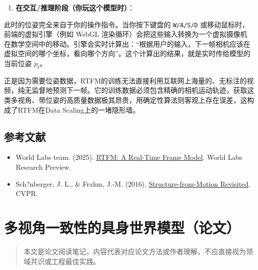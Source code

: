 \begin{enumerate}
\def\labelenumi{\arabic{enumi}.}
\setcounter{enumi}{1}
\tightlist
\item
  \textbf{在交互/推理阶段（你玩这个模型时）}：
\end{enumerate}

此时的位姿完全来自于你的操作指令。当你按下键盘的 \texttt{W/A/S/D} 或移动鼠标时，前端的虚拟引擎（例如 WebGL 渲染循环）会把这些输入转换为一个虚拟摄像机在数学空间中的移动。引擎会实时计算出：``根据用户的输入，下一帧相机应该在虚拟空间的哪个坐标，看向哪个方向''。这个计算出的结果，就是实时传给模型的当前位姿 \(p_t\)。

正是因为需要位姿数据，RTFM的训练无法直接利用互联网上海量的、无标注的视频，纯无监督地预测下一帧。它的训练数据必须包含精确的相机运动轨迹，获取这类多视角、带位姿的高质量数据极其昂贵，用确定性算法则客观上存在误差，这构成了RTFM在Data Scaling上的一堵隐形墙。

\hypertarget{ux53c2ux8003ux6587ux732e-183}{%
\subsection{参考文献}\label{ux53c2ux8003ux6587ux732e-183}}

\begin{itemize}
\tightlist
\item
  World Labs team. (2025). \href{https://www.worldlabs.ai/blog/rtfm}{RTFM: A Real-Time Frame Model}. World Labs Research Preview.
\item
  Sch?nberger, J. L., \& Frahm, J.-M. (2016). \href{https://openaccess.thecvf.com/content_cvpr_2016/html/Schonberger_Structure-From-Motion_Revisited_CVPR_2016_paper.html}{Structure-from-Motion Revisited}. CVPR.
\end{itemize}

\clearpage

\hypertarget{ux591aux89c6ux89d2ux4e00ux81f4ux6027ux7684ux5177ux8eabux4e16ux754cux6a21ux578bux8bbaux6587}{%
\section{多视角一致性的具身世界模型（论文）}\label{ux591aux89c6ux89d2ux4e00ux81f4ux6027ux7684ux5177ux8eabux4e16ux754cux6a21ux578bux8bbaux6587}}

\begin{quote}
本文是论文阅读笔记，内容代表对应论文方法或作者理解，不应直接视为领域共识或工程最佳实践。
\end{quote}

